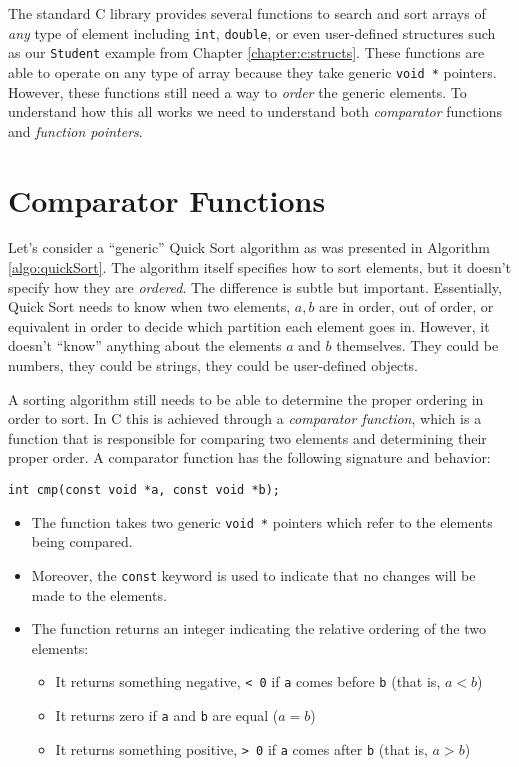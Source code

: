 

The standard C library provides several functions to search and sort
arrays of \emph{any} type of element including \texttt{int}, 
\texttt{double}, or even user-defined structures such as our
\texttt{Student} example from Chapter \ref{chapter:c:structs}.  
These functions are able to operate on any type of array because they
take generic \texttt{void *} pointers.  However, these functions
still need a way to \emph{order} the generic elements.  To understand
how this all works we need to understand both \emph{comparator} functions
and \emph{function pointers}.

\section{Comparator Functions}

Let's consider a ``generic'' Quick Sort algorithm as was presented in
Algorithm \ref{algo:quickSort}.  The algorithm itself specifies how to 
sort elements, but
it doesn't specify how they are \emph{ordered}.  The difference is subtle
but important.  Essentially, Quick Sort needs to know when two elements, 
$a, b$ are in order, out of order, or equivalent in order to decide which
partition each element goes in.  However, it doesn't ``know'' anything about
the elements $a$ and $b$ themselves.  They could be numbers, they could
be strings, they could be user-defined objects.  

A sorting algorithm still needs to be able to determine the proper ordering 
in order to sort.  In C this is achieved through a \emph{comparator function}, 
which is a function that is responsible for comparing two elements and
determining their proper order.  A comparator function has the following 
signature and behavior:

\texttt{int cmp(const void *a, const void *b);}

\begin{itemize}
  \item The function takes two generic \texttt{void *} pointers which
  	refer to the elements being compared.  
  \item Moreover, the \texttt{const} keyword is used to indicate that
  	no changes will be made to the elements.
  \item The function returns an integer indicating the relative ordering of
  	the two elements:
	\begin{itemize}
	  \item It returns something negative, \texttt{< 0} if \texttt{a}
	  comes before \texttt{b} (that is, $a < b$)
	  \item It returns zero if \texttt{a} and \texttt{b} are
	  equal ($a = b$)
	  \item It returns something positive, \texttt{> 0} if \texttt{a}
	  comes after \texttt{b} (that is, $a > b$)
	\end{itemize}
\end{itemize}

